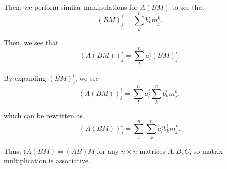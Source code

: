 \documentclass{article}
\begin{document}
\begin{enumerate}
{\begin{enumerate}
{                Then, we perform similar manipulations for \(A(BM)\) to see that
                \[(BM)^i_j = \sum_k^n{b^i_k m^k_j}.\]

                Then, we see that 
                \[(A(BM))^i_j = \sum_l^n{a^i_l (BM)^i_j}.\]

                By expanding \((BM)^i_j\), we see 
                \[(A(BM))^i_j = \sum_l^n{a^i_l \sum_k^n{b^i_k m^k_j}},\]
                
                which can be rewritten as
                \[(A(BM))^i_j = \sum_l^n{\sum_k^n a^i_l b^i_k m^k_j}.\]

                Thus, \((A(BM) = (AB)M\) for any \(n \times n\) matrices \(A, B, C\),
                so matrix multiplication is associative.
            }
        \end{enumerate}
    }
\end{enumerate}
\end{document}
